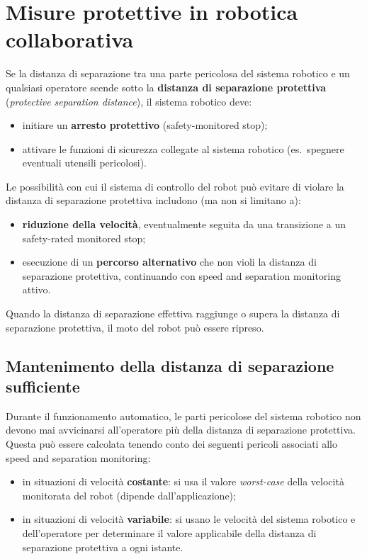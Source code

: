 \section{Misure protettive in robotica collaborativa}
Se la distanza di separazione tra una parte pericolosa del sistema robotico e un qualsiasi operatore scende sotto la \textbf{distanza di separazione protettiva} (\emph{protective separation distance}), il sistema robotico deve:
\begin{itemize}
    \item initiare un \textbf{arresto protettivo} (safety-monitored stop);
    \item attivare le funzioni di sicurezza collegate al sistema robotico (es.\ spegnere eventuali utensili pericolosi).
\end{itemize}

Le possibilità con cui il sistema di controllo del robot può evitare di violare la distanza di separazione protettiva includono (ma non si limitano a):
\begin{itemize}
    \item \textbf{riduzione della velocità}, eventualmente seguita da una transizione a un safety-rated monitored stop;
    \item esecuzione di un \textbf{percorso alternativo} che non violi la distanza di separazione protettiva, continuando con speed and separation monitoring attivo.
\end{itemize}
Quando la distanza di separazione effettiva raggiunge o supera la distanza di separazione protettiva, il moto del robot può essere ripreso.

\subsection{Mantenimento della distanza di separazione sufficiente}
Durante il funzionamento automatico, le parti pericolose del sistema robotico non devono mai avvicinarsi all'operatore più della distanza di separazione protettiva. Questa può essere calcolata tenendo conto dei seguenti pericoli associati allo speed and separation monitoring:
\begin{itemize}
    \item in situazioni di velocità \textbf{costante}: si usa il valore \emph{worst-case} della velocità monitorata del robot (dipende dall'applicazione);
    \item in situazioni di velocità \textbf{variabile}: si usano le velocità del sistema robotico e dell'operatore per determinare il valore applicabile della distanza di separazione protettiva a ogni istante.
\end{itemize}


